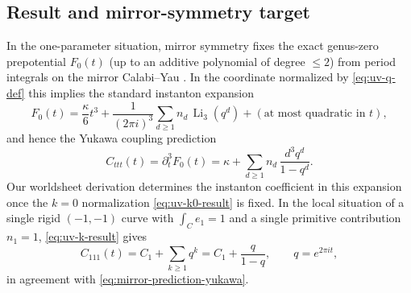 \documentclass[12pt]{article}
\begin{document}
\subsection{Result and mirror-symmetry target}
In the one-parameter situation, mirror symmetry fixes the exact genus-zero
prepotential $F_0(t)$ (up to an additive polynomial of degree $\le 2$) from
period integrals on the mirror Calabi--Yau \cite{Candelas:1990rm}. In the
coordinate normalized by \eqref{eq:uv-q-def} this implies the standard instanton
expansion \cite{Candelas:1990rm,AspinwallMorrison:1991tft}
\begin{equation}
  F_0(t)=\frac{\kappa}{6}t^3+\frac{1}{(2\pi i)^3}\sum_{d\ge1} n_d\,\operatorname{Li}_3(q^d)
  +(\text{at most quadratic in }t),
  \label{eq:mirror-prediction-prepotential}
\end{equation}
and hence the Yukawa coupling prediction
\begin{equation}
  C_{ttt}(t)=\partial_t^3 F_0(t)
  =\kappa+\sum_{d\ge1} n_d\,\frac{d^3 q^d}{1-q^d}.
  \label{eq:mirror-prediction-yukawa}
\end{equation}
Our worldsheet derivation determines the instanton coefficient in this
expansion once the $k=0$ normalization \eqref{eq:uv-k0-result} is fixed. In the
local situation of a single rigid $(-1,-1)$ curve with $\int_C e_1=1$ and a
single primitive contribution $n_1=1$, \eqref{eq:uv-k-result} gives
\begin{equation}
  C_{111}(t)=C_1+\sum_{k\ge1} q^k
  =
  C_1+\frac{q}{1-q},
  \qquad q=e^{2\pi i t},
  \label{eq:uv-final-answer}
\end{equation}
in agreement with \eqref{eq:mirror-prediction-yukawa}.



\end{document}
